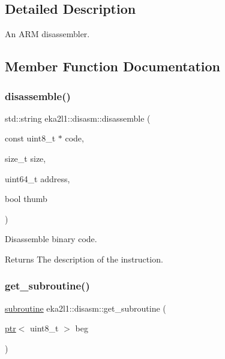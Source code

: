 \subsection{Detailed Description}
An A\+RM disassembler. 

\subsection{Member Function Documentation}
\mbox{\label{classeka2l1_1_1disasm_a7c2a3e456387d014cf38ab05db5340b0}} 
\subsubsection{\texorpdfstring{disassemble()}{disassemble()}}
{\footnotesize\ttfamily std\+::string eka2l1\+::disasm\+::disassemble (\begin{DoxyParamCaption}\item[{const uint8\+\_\+t $\ast$}]{code,  }\item[{size\+\_\+t}]{size,  }\item[{uint64\+\_\+t}]{address,  }\item[{bool}]{thumb }\end{DoxyParamCaption})}



Disassemble binary code. 

\begin{DoxyReturn}{Returns}
The description of the instruction. 
\end{DoxyReturn}
\mbox{\label{classeka2l1_1_1disasm_ab845c7a9933b477e94bc4be29498c0a1}} 
\subsubsection{\texorpdfstring{get\+\_\+subroutine()}{get\_subroutine()}}
{\footnotesize\ttfamily \mbox{\hyperlink{structeka2l1_1_1subroutine}{subroutine}} eka2l1\+::disasm\+::get\+\_\+subroutine (\begin{DoxyParamCaption}\item[{\mbox{\hyperlink{classeka2l1_1_1ptr}{ptr}}$<$ uint8\+\_\+t $>$}]{beg }\end{DoxyParamCaption})}



